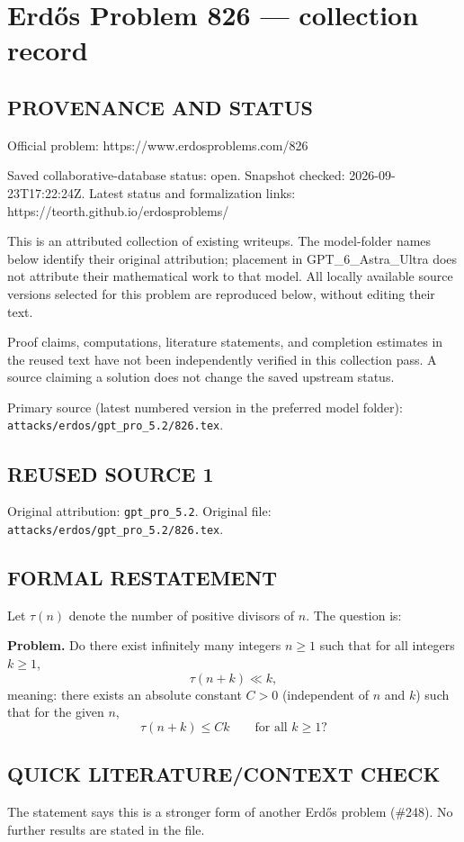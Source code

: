 \section*{Erd\H{o}s Problem 826 --- collection record}

\subsection*{PROVENANCE AND STATUS}
Official problem: https://www.erdosproblems.com/826

Saved collaborative-database status: open.
Snapshot checked: 2026-09-23T17:22:24Z.
Latest status and formalization links: https://teorth.github.io/erdosproblems/

This is an attributed collection of existing writeups. The model-folder names below identify their original attribution; placement in GPT\_6\_Astra\_Ultra does not attribute their mathematical work to that model. All locally available source versions selected for this problem are reproduced below, without editing their text.

Proof claims, computations, literature statements, and completion estimates in the reused text have not been independently verified in this collection pass. A source claiming a solution does not change the saved upstream status.

Primary source (latest numbered version in the preferred model folder): \texttt{attacks/erdos/gpt\_pro\_5.2/826.tex}.

\subsection*{REUSED SOURCE 1}
Original attribution: \texttt{gpt\_pro\_5.2}.
Original file: \texttt{attacks/erdos/gpt\_pro\_5.2/826.tex}.


\subsection*{FORMAL RESTATEMENT}
Let $\tau(n)$ denote the number of positive divisors of $n$. The question is:

\medskip
\noindent\textbf{Problem.} Do there exist infinitely many integers $n\ge 1$ such that for all integers $k\ge 1$,
\[
\tau(n+k) \ll k,
\]
meaning: there exists an absolute constant $C>0$ (independent of $n$ and $k$) such that for the given $n$,
\[
\tau(n+k)\le Ck\qquad\text{for all }k\ge 1?
\]

\subsection*{QUICK LITERATURE/CONTEXT CHECK}
The statement says this is a stronger form of another Erd\H{o}s problem (\#248). No further results are stated in the file.

